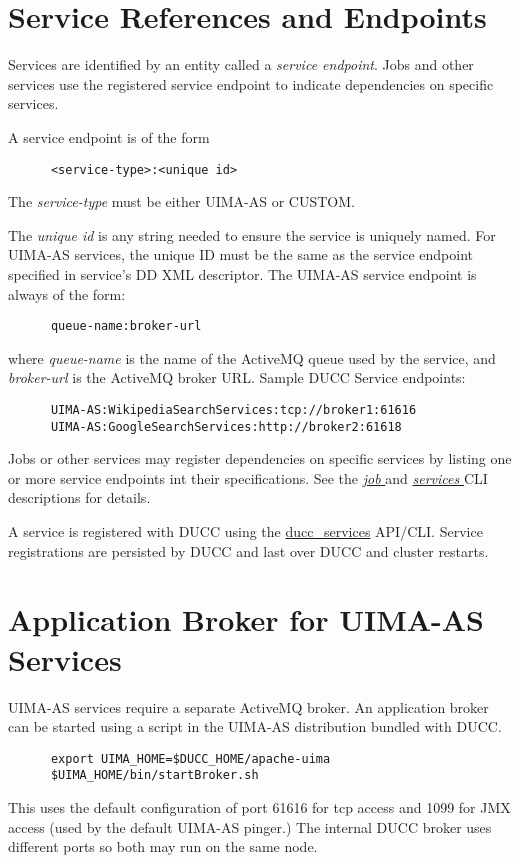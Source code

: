       \section{Service References and Endpoints} 
      \label{sec:service.endpoints}
      Services are identified by an entity called a {\em service endpoint}.  Jobs and other
      services use the registered service endpoint to indicate dependencies on specific
      services.

      A service endpoint is of the form 
\begin{verbatim}
      <service-type>:<unique id>
\end{verbatim}
      
      The {\em service-type} must be either UIMA-AS or CUSTOM.
      
      The {\em unique id} is any string needed to ensure the service is
      uniquely named.  For UIMA-AS services, the unique ID must be the same as the
      service endpoint specified in service's DD XML descriptor.  The UIMA-AS
      service endpoint is always of the form:
\begin{verbatim}
      queue-name:broker-url
\end{verbatim}
      where {\em queue-name} is the name of the ActiveMQ queue used by the service, and {\em broker-url}
      is the ActiveMQ broker URL.  Sample DUCC Service endpoints: 
\begin{verbatim}
      UIMA-AS:WikipediaSearchServices:tcp://broker1:61616
      UIMA-AS:GoogleSearchServices:http://broker2:61618
\end{verbatim}

      Jobs or other services may register dependencies on specific services by listing one or more
      service endpoints int their specifications. See the 
      \hyperref[sec:cli.ducc-submit]{\em job } and 
      \hyperref[sec:cli.ducc-services]{\em services } CLI descriptions for details.
                       
      A service is registered with DUCC using the \hyperref[sec:cli.ducc-services]{ducc\_services}
      API/CLI. Service registrations are persisted by DUCC and last over DUCC and cluster restarts.

      \section{Application Broker for UIMA-AS Services}
      \label{sec:service.uima-as-broker}
      UIMA-AS services require a separate ActiveMQ broker.  An application broker can be started
      using a script in the UIMA-AS distribution bundled with DUCC.
\begin{verbatim}
      export UIMA_HOME=$DUCC_HOME/apache-uima
      $UIMA_HOME/bin/startBroker.sh
\end{verbatim}
      This uses the default configuration of port 61616 for tcp access and 1099 for JMX access (used
      by the default UIMA-AS pinger.)  The internal DUCC broker uses different ports so both may run
      on the same node.

